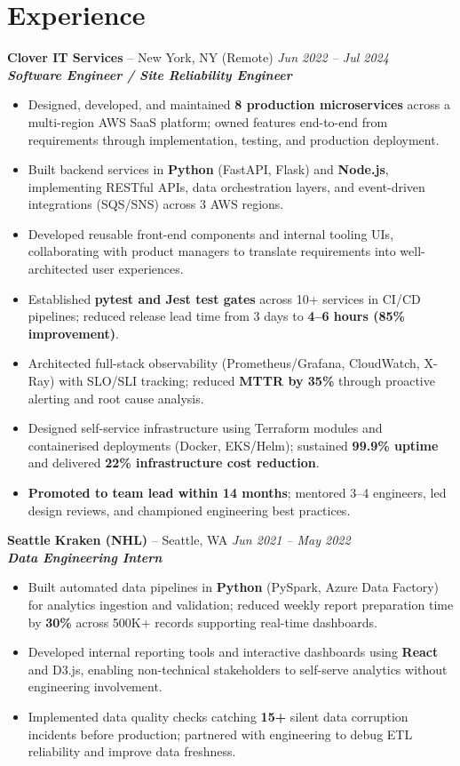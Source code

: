 \documentclass[10pt,a4paper]{article}
\newcommand{\jobentry}[4]{%
  \Needspace{3\baselineskip}%
  \textbf{#1} -- #2 \hfill \textit{#3}\\[-0.15em]
  \textit{#4}\\[-0.25em]
}
\begin{document}
\section*{Experience}
\jobentry{Clover IT Services}{New York, NY (Remote)}{Jun 2022 -- Jul 2024}{\textbf{\textit{Software Engineer / Site Reliability Engineer}}}
\begin{itemize}
  \item Designed, developed, and maintained \textbf{8 production microservices} across a multi-region AWS SaaS platform; owned features end-to-end from requirements through implementation, testing, and production deployment.
  \item Built backend services in \textbf{Python} (FastAPI, Flask) and \textbf{Node.js}, implementing RESTful APIs, data orchestration layers, and event-driven integrations (SQS/SNS) across 3 AWS regions.
  \item Developed reusable front-end components and internal tooling UIs, collaborating with product managers to translate requirements into well-architected user experiences.
  \item Established \textbf{pytest and Jest test gates} across 10+ services in CI/CD pipelines; reduced release lead time from 3 days to \textbf{4--6 hours (85\% improvement)}.
  \item Architected full-stack observability (Prometheus/Grafana, CloudWatch, X-Ray) with SLO/SLI tracking; reduced \textbf{MTTR by 35\%} through proactive alerting and root cause analysis.
  \item Designed self-service infrastructure using Terraform modules and containerised deployments (Docker, EKS/Helm); sustained \textbf{99.9\% uptime} and delivered \textbf{22\% infrastructure cost reduction}.
  \item \textbf{Promoted to team lead within 14 months}; mentored 3--4 engineers, led design reviews, and championed engineering best practices.
\end{itemize}
\jobentry{Seattle Kraken (NHL)}{Seattle, WA}{Jun 2021 -- May 2022}{\textbf{\textit{Data Engineering Intern}}}
\begin{itemize}
  \item Built automated data pipelines in \textbf{Python} (PySpark, Azure Data Factory) for analytics ingestion and validation; reduced weekly report preparation time by \textbf{30\%} across 500K+ records supporting real-time dashboards.
  \item Developed internal reporting tools and interactive dashboards using \textbf{React} and D3.js, enabling non-technical stakeholders to self-serve analytics without engineering involvement.
  \item Implemented data quality checks catching \textbf{15+} silent data corruption incidents before production; partnered with engineering to debug ETL reliability and improve data freshness.
\end{itemize}
\end{document}
